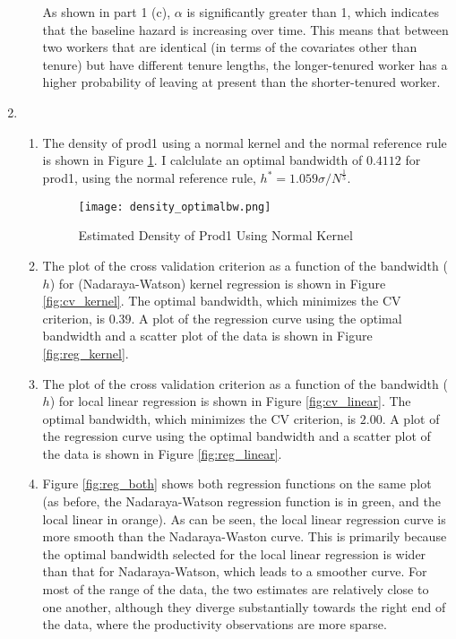 \documentclass[]{report}
\newcommand{\0}{\bv{0}}
\newcommand{\1}{\bv{1}}
\begin{document}
\begin{enumerate}[1.]
\begin{enumerate}
As shown in part 1 (c), $\alpha$ is significantly greater than 1, which indicates that the baseline hazard is increasing over time. This means that between two workers that are identical (in terms of the covariates other than tenure) but have different tenure lengths, the longer-tenured worker has a higher probability of leaving at present than the shorter-tenured worker.


\end{enumerate}

\item

\begin{enumerate}
	\item
	
	The density of prod1 using a normal kernel and the normal reference rule is shown in Figure \ref{fig:density}. I calclulate an optimal bandwidth of $ 0.4112$ for prod1, using the normal reference rule,  $h^* = 1.059 \sigma / N^{\frac{1}{5}}$.

\begin{figure}[hbtp]
	\begin{center}
		\caption{Estimated Density of Prod1 Using Normal Kernel}
		\label{fig:density}
		\texttt{[image: density\_optimalbw.png]}
	\end{center}
\end{figure}

\item

The plot of the cross validation criterion as a function of the bandwidth ($h$) for (Nadaraya-Watson) kernel regression is shown in Figure \ref{fig:cv_kernel}. The optimal bandwidth, which minimizes the CV criterion, is $0.39$. A plot of the regression curve using the optimal bandwidth and a scatter plot of the data is shown in Figure \ref{fig:reg_kernel}.



\item


The plot of the cross validation criterion as a function of the bandwidth ($h$) for local linear regression is shown in Figure \ref{fig:cv_linear}. The optimal bandwidth, which minimizes the CV criterion, is $2.00$. A plot of the regression curve using the optimal bandwidth and a scatter plot of the data is shown in Figure \ref{fig:reg_linear}.




\item

Figure \ref{fig:reg_both} shows both regression functions on the same plot (as before, the Nadaraya-Watson regression function is in green, and the local linear in orange). As can be seen, the local linear regression curve is more smooth than the Nadaraya-Waston curve. This is primarily because the optimal bandwidth selected for the local linear regression is wider than that for Nadaraya-Watson, which leads to a smoother curve.  For most of the range of the data, the two estimates are relatively close to one another, although they diverge substantially towards the right end of the data, where the productivity observations are more sparse. 


\end{enumerate}
\end{enumerate}
\end{document}

